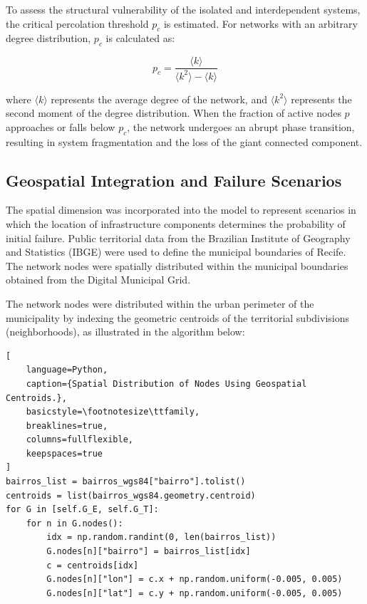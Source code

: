 \documentclass[journal]{IEEEtran}
\begin{document}
To assess the structural vulnerability of the isolated and interdependent systems, the critical percolation threshold $p_c$ is estimated. For networks with an arbitrary degree distribution, $p_c$ is calculated as:

\begin{equation}
p_c = \frac{\langle k \rangle}
{\langle k^2 \rangle - \langle k \rangle}
\label{eq:pc}
\end{equation}

where $\langle k \rangle$ represents the average degree of the network, and $\langle k^2 \rangle$ represents the second moment of the degree distribution. When the fraction of active nodes $p$ approaches or falls below $p_c$, the network undergoes an abrupt phase transition, resulting in system fragmentation and the loss of the giant connected component.

\subsection{Geospatial Integration and Failure Scenarios} 
The spatial dimension was incorporated into the model to represent scenarios in which the location of infrastructure components determines the probability of initial failure. Public territorial data from the Brazilian Institute of Geography and Statistics (IBGE)\cite{ibge2026} were used to define the municipal boundaries of Recife. 
The network nodes were spatially distributed within the municipal boundaries obtained from the Digital Municipal Grid\cite{ibgemalha2022}.

The network nodes were distributed within the urban perimeter of the municipality by indexing the geometric centroids of the territorial subdivisions (neighborhoods), as illustrated in the algorithm below:

\begin{lstlisting}[
    language=Python, 
    caption={Spatial Distribution of Nodes Using Geospatial Centroids.},
    basicstyle=\footnotesize\ttfamily,
    breaklines=true,
    columns=fullflexible,
    keepspaces=true
]
bairros_list = bairros_wgs84["bairro"].tolist()
centroids = list(bairros_wgs84.geometry.centroid)
for G in [self.G_E, self.G_T]:
    for n in G.nodes():
        idx = np.random.randint(0, len(bairros_list))
        G.nodes[n]["bairro"] = bairros_list[idx]
        c = centroids[idx]
        G.nodes[n]["lon"] = c.x + np.random.uniform(-0.005, 0.005)
        G.nodes[n]["lat"] = c.y + np.random.uniform(-0.005, 0.005)
\end{lstlisting}
\end{document}
